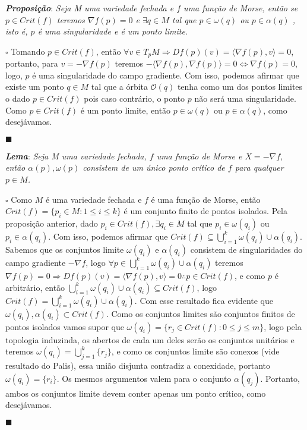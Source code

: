 \documentclass[12pt]{book}
\newcommand{\tese}[3]{\vspace{2mm} \textit{\textbf{#1}}: \textit{#2} \par $\square$ #3 \par $\blacksquare$}
\newcommand{\innerprod}[2]{\langle #1, #2 \rangle}
\begin{document}
	\tese{Proposição}{Seja M uma variedade fechada e $f$ uma função de Morse, então se $p \in Crit(f)$ teremos $\nabla f(p)=0$ e $\exists q \in M$ tal que $p \in \omega(q)$ ou $p \in \alpha(q)$ , isto é, $p$ é uma singularidade e é um ponto limite.}{Tomando $p \in Crit(f)$, então $\forall v \in T_{p}M \Rightarrow Df(p)(v) = \innerprod{\nabla f(p)}{v} = 0$, portanto, para $v = -\nabla f(p)$ teremos $-\innerprod{\nabla f(p)}{\nabla f(p)} = 0 \iff \nabla f(p) = 0$, logo, $p$ é uma singularidade do campo gradiente. Com isso, podemos afirmar que existe um ponto $q \in M$ tal que a órbita $\mathcal{O}(q)$ tenha como um dos pontos limites o dado $p \in Crit(f)$ pois caso contrário, o ponto $p$ não será uma singularidade. Como $p \in Crit(f)$ é um ponto limite, então $p \in \omega(q)$ ou $p \in \alpha(q)$, como desejávamos.}
	
	\tese{Lema}{Seja M uma variedade fechada, $f$ uma função de Morse e $X =-\nabla f$, então $\alpha(p), \omega(p)$ consistem de um único ponto crítico de $f$ para qualquer $p \in M$.}
	{Como $M$ é uma variedade fechada e $f$ é uma função de Morse, então $Crit(f) = \{p_{i} \in M: 1\leq i \leq k \}$ é um conjunto finito de pontos isolados. Pela proposição anterior, dado $p_{i} \in Crit(f), \exists q_{i} \in M$ tal que $p_{i} \in \omega(q_{i})$ ou $p_{i} \in \alpha(q_{i})$. Com isso, podemos afirmar que $Crit(f) \subseteq \bigcup_{i=1}^{k}\omega(q_{i}) \cup \alpha(q_{i})$. Sabemos que os conjuntos limite $\omega(q_{i})$ e $\alpha(q_{i})$ consistem de singularidades do campo gradiente $-\nabla f$, logo $\forall p \in \bigcup_{i=1}^{k}\omega(q_{i}) \cup \alpha(q_{i})$ teremos $\nabla f(p) = 0 \Rightarrow Df(p)(v) = \innerprod{\nabla f(p)}{v} = 0 \therefore p \in Crit(f)$, e como $p$ é arbitrário, então $\bigcup_{i=1}^{k}\omega(q_{i}) \cup \alpha(q_{i}) \subseteq Crit(f)$, logo $Crit(f) = \bigcup_{i=1}^{k}\omega(q_{i}) \cup \alpha(q_{i})$. Com esse resultado fica evidente que $\omega(q_{i}), \alpha(q_{i}) \subset Crit(f)$. Como os conjuntos limites são conjuntos finitos de pontos isolados vamos supor que $\omega(q_{i}) = \{r_{j} \in Crit(f): 0\leq j \leq m\}$, logo pela topologia induzinda, os abertos de cada um deles serão os conjuntos unitários e teremos $\omega(q_{i}) = \bigcup_{j=1}^{k} \{r_{j}\} $, e como os conjuntos limite são conexos (vide resultado do Palis), essa união disjunta contradiz a conexidade, portanto $\omega(q_{i}) = \{r_{i}\}$. Os mesmos argumentos valem para o conjunto $\alpha(q_{j})$. Portanto, ambos os conjuntos limite devem conter apenas um ponto crítico, como desejávamos.}
	
\end{document}
